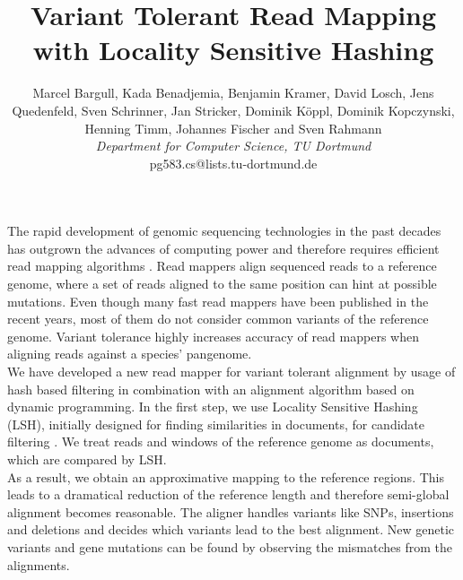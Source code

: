 \documentclass[english]{short}
\title{Variant Tolerant Read Mapping with Locality Sensitive Hashing}
\author{Marcel Bargull, Kada Benadjemia, Benjamin Kramer, David Losch, Jens Quedenfeld, Sven Schrinner, Jan Stricker, Dominik K{\"o}ppl, Dominik Kopczynski, Henning Timm, Johannes Fischer and Sven Rahmann\\
{\normalsize\it Department for Computer Science, TU Dortmund}\\
pg583.cs@lists.tu-dortmund.de}
\begin{document}
\maketitle
The rapid development of genomic sequencing technologies in the past decades has outgrown the advances of computing power and therefore requires efficient read mapping algorithms \cite{Loh2012}. Read mappers align sequenced reads to a reference genome, where a set of reads aligned to the same position can hint at possible mutations. Even though many fast read mappers have been published in the recent years, most of them do not consider common variants of the reference genome.
Variant tolerance highly increases accuracy of read mappers when aligning reads against a species' pangenome. \\
We have developed a new read mapper for variant tolerant alignment by usage of hash based filtering in combination with an alignment algorithm based on dynamic programming. In the first step, we use Locality Sensitive Hashing (LSH), initially designed for finding similarities in documents, for candidate filtering \cite{Adoni2006}. We treat reads and windows of the reference genome as documents, which are compared by LSH.\\
As a result, we obtain an approximative mapping to the reference regions. This leads to a dramatical reduction of the reference length and therefore semi-global alignment becomes reasonable. The aligner handles variants like SNPs, insertions and deletions and decides which variants lead to the best alignment.
New genetic variants and gene mutations can be found by observing the mismatches from the alignments.

\end{document}
